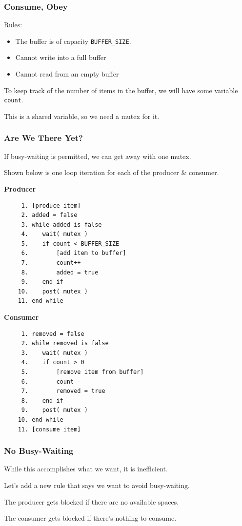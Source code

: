 \begin{frame}
	\frametitle{Consume, Obey}

	Rules:
	\begin{itemize}
		\item The buffer is of capacity \texttt{BUFFER\_SIZE}.
		\item Cannot write into a full buffer
		\item Cannot read from an empty buffer
	\end{itemize}

	To keep track of the number of items in the buffer, we will have some variable \texttt{count}.

	This is a shared variable, so we need a mutex for it.

\end{frame}


\begin{frame}[fragile]
	\frametitle{Are We There Yet?}

	If busy-waiting is permitted, we can get away with one mutex.

	Shown below is one loop iteration for each of the producer \& consumer.
		{\small
			\begin{multicols}{2}
				\textbf{Producer}
				\begin{verbatim}
	 1. [produce item]
	 2. added = false
	 3. while added is false
	 4.    wait( mutex )
	 5.    if count < BUFFER_SIZE
	 6.        [add item to buffer]
	 7.        count++
	 8.        added = true
	 9.    end if
	10.    post( mutex )
	11. end while
  \end{verbatim}
				\columnbreak
				\textbf{Consumer}
				\begin{verbatim}
	 1. removed = false
	 2. while removed is false
	 3.    wait( mutex )
	 4.    if count > 0
	 5.        [remove item from buffer]
	 6.        count--
	 7.        removed = true
	 8.    end if
	 9.    post( mutex )
	10. end while
	11. [consume item]
  \end{verbatim}
			\end{multicols}
			\vspace{-2em}
		}

\end{frame}


\begin{frame}
	\frametitle{No Busy-Waiting}

	While this accomplishes what we want, it is inefficient.

	Let's add a new rule that says we want to avoid busy-waiting.

	The producer gets blocked if there are no available spaces.

	The consumer gets blocked if there's nothing to consume.

\end{frame}



